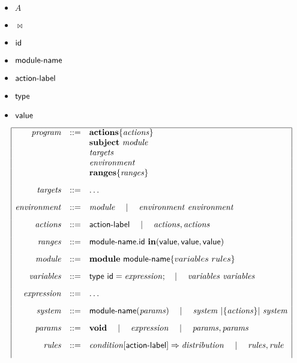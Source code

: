 \begin{itemize}
	\item $A$
	\item $\Join$
	\item ${\sf id}$
	\item ${\sf module}\textrm{-}{\sf name}$
	\item ${\sf action}\textrm{-}{\sf label}$
	\item ${\sf type}$
	\item ${\sf value}$
\end{itemize}

\begin{table} %
$$
\begin{array}{|rcl|}
\hline
\mathit{program} &::=& \mathbf{actions} \{ \mathit{actions} \} \\
	&& \mathbf{subject} \Space \mathit{module} \\
	&& \mathit{targets} \\
	&& \mathit{environment} \\
	&& \mathbf{ranges} \{ \mathit{ranges} \}
	\\[.3cm]
\mathit{targets} &::=& \dots
	\\[.3cm]	
\mathit{environment} &::=& \mathit{module} \Sep \mathit{environment} \Space \mathit{environment}
	\\[.3cm]
\mathit{actions} &::=& \x{action}\textrm{-}\x{label} \Sep \mathit{actions} , \mathit{actions}
	\\[.3cm]
\mathit{ranges} &::=& \x{module}\textrm{-}\x{name} . \x{id} \Space \mathbf{in} ( \x{value} , \x{value}, \x{value} )
	\\[.3cm]
\mathit{module} &::=& \mathbf{module} \Space \x{module}\textrm{-}\x{name} \{ variables \Space rules \}
	\\[.3cm]
\mathit{variables} &::=& \x{type} \Space \x{id} = \mathit{expression}; \Sep \mathit{variables} \Space \mathit{variables}
	\\[.3cm]
\mathit{expression} &::=& \dots
	\\[.3cm]
\mathit{system} &::=& \x{module}\textrm{-}\x{name}(\mathit{params}) \Sep \mathit{system} \Par{\{\mathit{actions}\}} \mathit{system}
	\\[.3cm]
\mathit{params} &::=& \mathbf{void} \Sep \mathit{expression} \Sep \mathit{params}, \mathit{params}
	\\[.3cm]
\mathit{rules} &::=& \mathit{condition} [ \x{action}\textrm{-}\x{label}]\Rightarrow \mathit{distribution} \Sep \mathit{rules},\mathit{rule}
	\\[.3cm]

\end{array}$$
\end{table}
